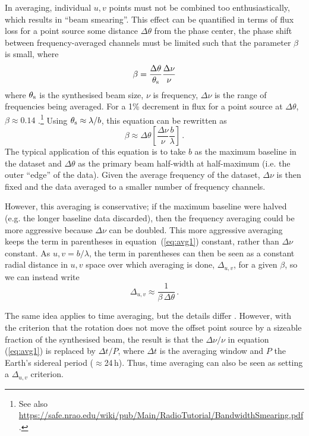 \documentclass[fleqn,usenatbib]{mnras}
\begin{document}
In averaging, individual $u,v$ points must not be combined too enthusiastically, which results in ``beam smearing''. This effect can be quantified in terms of flux loss for a point source some distance $\Delta \theta$ from the phase center, the phase shift between frequency-averaged channels must be limited such that the parameter $\beta$ is small, where
\begin{equation}
    \beta = \frac{\Delta \theta}{\theta_{\rm s}} \frac{\Delta \nu}{\nu}
\end{equation}
where $\theta_{\rm s}$ is the synthesised beam size, $\nu$ is frequency, $\Delta \nu$ is the range of frequencies being averaged. For a 1\% decrement in flux for a point source at $\Delta \theta$, $\beta \approx 0.14$ \citep{1989ASPC....6..247B}.\footnote{See also \href{https://safe.nrao.edu/wiki/pub/Main/RadioTutorial/BandwidthSmearing.pdf}{https://safe.nrao.edu/wiki/pub/Main/RadioTutorial/BandwidthSmearing.pdf}.} Using $\theta_{\rm s} \approx \lambda/b$, this equation can be rewritten as
\begin{equation}\label{eq:avg1}
    \beta \approx \Delta \theta \left[ \frac{\Delta \nu}{\nu} \frac{b}{\lambda} \right] \, .
\end{equation}
The typical application of this equation is to take $b$ as the maximum baseline in the dataset and $\Delta \theta$ as the primary beam half-width at half-maximum (i.e. the outer ``edge'' of the data). Given the average frequency of the dataset, $\Delta \nu$ is then fixed and the data averaged to a smaller number of frequency channels.

However, this averaging is conservative; if the maximum baseline were halved (e.g. the longer baseline data discarded), then the frequency averaging could be more aggressive because $\Delta \nu$ can be doubled. This more aggressive averaging keeps the term in parentheses in equation~(\ref{eq:avg1}) constant, rather than $\Delta \nu$ constant. As $u,v = b/\lambda$, the term in parentheses can then be seen as a constant radial distance in $u,v$ space over which averaging is done, $\Delta_{u,v}$, for a given $\beta$, so we can instead write
\begin{equation}\label{eq:avg2}
    \Delta_{u,v} \approx \frac{1}{\beta \, \Delta \theta} \, .
\end{equation}

The same idea applies to time averaging, but the details differ \citep{1989ASPC....6..247B}. However, with the criterion that the rotation does not move the offset point source by a sizeable fraction of the synthesised beam, the result is that the $\Delta \nu / \nu$ in equation (\ref{eq:avg1}) is replaced by $\Delta t / P$, where $\Delta t$ is the averaging window and $P$ the Earth's sidereal period ($\approx$24\,h). Thus, time averaging can also be seen as setting a $\Delta_{u,v}$ criterion.
\end{document}
